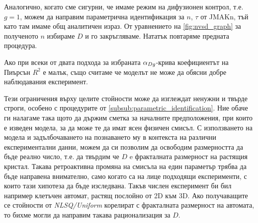 Аналогично, когато сме сигурни, че имаме режим на дифузионен контрол, т.е. $g = 1$, можем да направим параметрична идентификация за $n$, $\tau$ от JMAKn, тъй като там имаме общ аналитичен израз. От уравнението на \autoref{fig:nvsd_graph} за полученото $n$ избираме $D$ и го закръгляваме. Нататък повтаряме предната процедура.

Ако при всеки от двата подхода за избраната $\alpha_{Dg}$-крива коефициентът на Пиърсън $R^2$ е малък, също считаме че моделът не може да обясни добре наблюдавания експеримент.

Тези ограничения върху целите стойности може да изглеждат ненужни и твърде строги, особено с процедурите от \autoref{subsub:parametric_identification}. Ние обаче ги налагаме така щото да държим сметка за началните предположения, при които е изведен модела, за да може те да имат ясен физичен смисъл. 
С използването на модела и задълбочаването на познаването му в контекста на различни експериментални данни, можем да си позволим да освободим размерността да бъде реално число, т.е. да твърдим че $D$ e фракталната размерност на растящия кристал. Такава ретроактивна промяна на смисъла на един параметър трябва да бъде направена внимателно, само когато са на лице подходящи експерименти, с които тази хипотеза да бъде изследвана. Такъв числен експеримент би бил например клетъчен автомат, растящ послойно от 2D към 3D. Ако получаващите се стойности от \textit{NLSQ/Uniform} корелират с фракталната размерност на автомата, то бихме могли да направим такава рационализация за $D$.